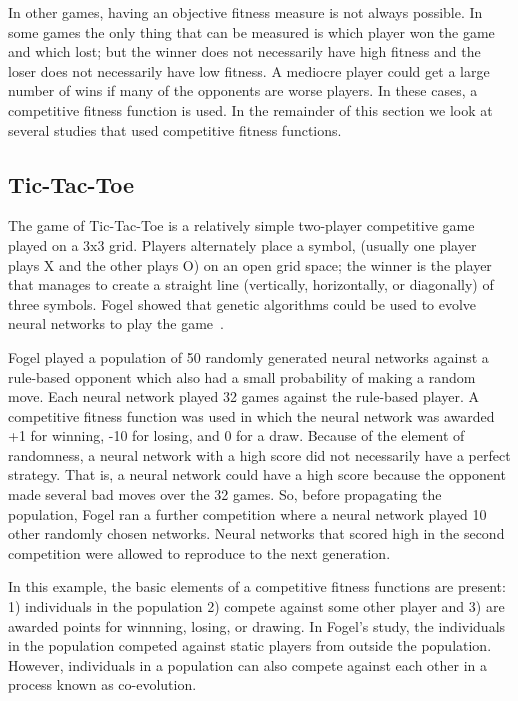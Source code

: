 In other games, having an objective fitness measure is not always possible. In
some games the only thing that can be measured is which player won the game and
which lost; but the winner does not necessarily have high fitness and the loser
does not necessarily have low fitness. A mediocre player could get a large
number of wins if many of the opponents are worse players. In these cases, a
competitive fitness function is used. In the remainder of this section we look
at several studies that used competitive fitness functions.

\subsection{Tic-Tac-Toe}

The game of Tic-Tac-Toe is a relatively simple two-player competitive game
played on a 3x3 grid. Players alternately place a symbol, (usually one player
plays X and the other plays O) on an open grid space; the winner is the player
that manages to create a straight line (vertically, horizontally, or diagonally)
of three symbols. Fogel showed that genetic algorithms could be used to evolve
neural networks to play the game~\cite{Fogel1993}.

Fogel played a population of 50 randomly generated neural networks against a
rule-based opponent which also had a small probability of making a random move.
Each neural network played 32 games against the rule-based player. A competitive
fitness function was used in which the neural network was awarded +1 for
winning, -10 for losing, and 0 for a draw. Because of the element of randomness,
a neural network with a high score did not necessarily have a perfect strategy.
That is, a neural network could have a high score because the opponent made
several bad moves over the 32 games. So, before propagating the population,
Fogel ran a further competition where a neural network played 10 other randomly
chosen networks. Neural networks that scored high in the second competition were
allowed to reproduce to the next generation.

In this example, the basic elements of a competitive fitness functions are
present: 1) individuals in the population 2) compete against some other player
and 3) are awarded points for winnning, losing, or drawing. In Fogel's study, the
individuals in the population competed against static players from outside the
population. However, individuals in a population can also compete against each
other in a process known as co-evolution.

